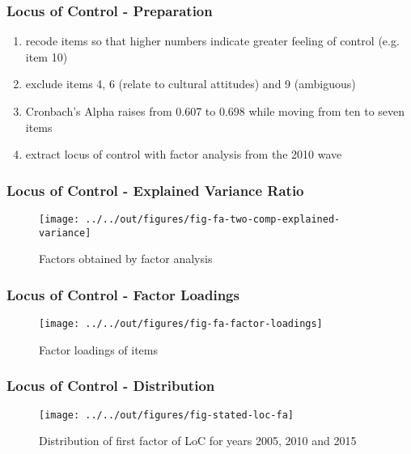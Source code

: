 \documentclass{beamer}
\begin{document}
\begin{frame}[t]\frametitle{Locus of Control - Preparation}

\begin{enumerate}[<+->]
    \item recode items so that higher numbers indicate greater feeling of
    control (e.g. item 10)
    \item exclude items 4, 6 (relate to cultural attitudes) and 9 (ambiguous)
    \item Cronbach's Alpha raises from 0.607 to 0.698 while moving from ten to
    seven items
    \item extract locus of control with factor analysis from the 2010 wave
\end{enumerate}


\end{frame}

\begin{frame}[c]\frametitle{Locus of Control - Explained Variance Ratio}

\begin{figure}[H]
    \centering
    \texttt{[image: ../../out/figures/fig-fa-two-comp-explained-variance]}
    \caption{Factors obtained by factor analysis}
    \label{fig:fa-ev}
\end{figure}

\end{frame}

\begin{frame}[c]\frametitle{Locus of Control - Factor Loadings}

\begin{figure}[H]
    \centering
    \texttt{[image: ../../out/figures/fig-fa-factor-loadings]}
    \caption{Factor loadings of items}
    \label{fig:fa-loadings}
\end{figure}

\end{frame}

\begin{frame}[c]\frametitle{Locus of Control - Distribution}

\begin{figure}[H]
    \centering
    \texttt{[image: ../../out/figures/fig-stated-loc-fa]}
    \caption{Distribution of first factor of LoC for years 2005, 2010 and 2015}
    \label{fig:stated-loc-dist}
\end{figure}

\end{frame}
\end{document}
